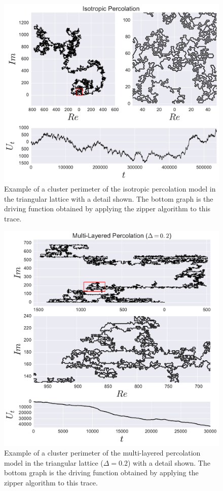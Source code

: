 \begin{figure}
\begin{center}
    \includegraphics[scale=0.5]{chapters/ch6-asle/figs/ip_trdr}
\end{center}
\caption{Example of a cluster perimeter of the isotropic percolation model in
    the triangular lattice with a detail shown. The bottom graph is the driving
    function obtained by applying the zipper algorithm to this trace.}
\label{fig:ip_trdr}
\end{figure}

\begin{figure}
\begin{center}
    \includegraphics[scale=0.5]{chapters/ch6-asle/figs/ml_trdr}
\end{center}
\caption{Example of a cluster perimeter of the multi-layered percolation model
    in the triangular lattice ($\Delta=0.2$) with a detail shown. The bottom
    graph is the driving function obtained by applying the zipper algorithm to
    this trace.}
\label{fig:ml_trdr}
\end{figure}

